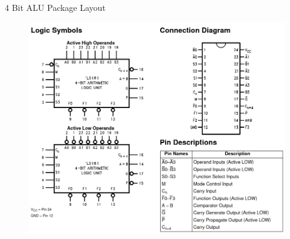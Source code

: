 \documentclass[12pt%
,aspectratio=169%
]{beamer}
\begin{document}
\begin{frame}{4 Bit ALU Package Layout}
\begin{figure}
\center
\includegraphics[scale=0.25]{pictures/layout_alu}
\end{figure}
\end{frame}
\end{document}
